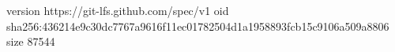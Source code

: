 version https://git-lfs.github.com/spec/v1
oid sha256:436214e9c30dc7767a9616f11ec01782504d1a1958893fcb15c9106a509a8806
size 87544
